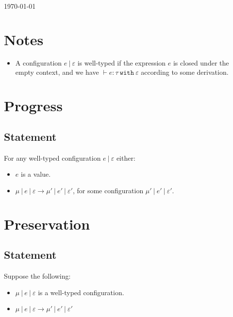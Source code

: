 \documentclass{llncs}
\newcommand{\keywadj}[1]{\mathtt{#1}}
\newcommand{\keyw}[1]{\keywadj{#1}~}
\begin{document}
\today

\section{Notes}

\begin{itemize}
	\item A configuration $e~|~\varepsilon$ is well-typed if the expression $e$ is closed under the empty context, and we have $\vdash e :\tau~\keyw{with} \varepsilon$ according to some derivation.
\end{itemize}

\section{Progress}

\subsection{Statement}

\paragraph{}
For any well-typed configuration $e~|~\varepsilon$ either:
\begin{itemize}
	\item $e$ is a value.
	\item $\mu~|~e~|~\varepsilon \longrightarrow \mu'~|~e'~|~\varepsilon'$, for some configuration $\mu'~|~e'~|~\varepsilon'$.
\end{itemize}

\section{Preservation}

\subsection{Statement}

\paragraph{}
Suppose the following:
\begin{itemize}
	\item $\mu~|~e~|~\varepsilon$ is a well-typed configuration.
	\item $\mu~|~e~|~\varepsilon \longrightarrow \mu'~|~e'~|~\varepsilon'$
\end{itemize}
\end{document}
